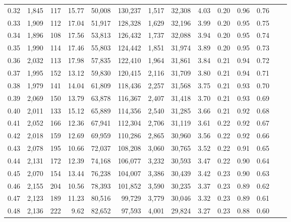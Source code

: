 \begin{tabular}{rrrrrrrrrrrrrr}
0.32 &  1,845 &    117 &   15.77 &   50,008 &  130,237 &   1,517 &  32,308 &  4.03 &  0.20 &  0.96 &      0.76 \\
0.33 &  1,909 &    112 &   17.04 &   51,917 &  128,328 &   1,629 &  32,196 &  3.99 &  0.20 &  0.95 &      0.75 \\
0.34 &  1,896 &    108 &   17.56 &   53,813 &  126,432 &   1,737 &  32,088 &  3.94 &  0.20 &  0.95 &      0.74 \\
0.35 &  1,990 &    114 &   17.46 &   55,803 &  124,442 &   1,851 &  31,974 &  3.89 &  0.20 &  0.95 &      0.73 \\
0.36 &  2,032 &    113 &   17.98 &   57,835 &  122,410 &   1,964 &  31,861 &  3.84 &  0.21 &  0.94 &      0.72 \\
0.37 &  1,995 &    152 &   13.12 &   59,830 &  120,415 &   2,116 &  31,709 &  3.80 &  0.21 &  0.94 &      0.71 \\
0.38 &  1,979 &    141 &   14.04 &   61,809 &  118,436 &   2,257 &  31,568 &  3.75 &  0.21 &  0.93 &      0.70 \\
0.39 &  2,069 &    150 &   13.79 &   63,878 &  116,367 &   2,407 &  31,418 &  3.70 &  0.21 &  0.93 &      0.69 \\
0.40 &  2,011 &    133 &   15.12 &   65,889 &  114,356 &   2,540 &  31,285 &  3.66 &  0.21 &  0.92 &      0.68 \\
0.41 &  2,052 &    166 &   12.36 &   67,941 &  112,304 &   2,706 &  31,119 &  3.61 &  0.22 &  0.92 &      0.67 \\
0.42 &  2,018 &    159 &   12.69 &   69,959 &  110,286 &   2,865 &  30,960 &  3.56 &  0.22 &  0.92 &      0.66 \\
0.43 &  2,078 &    195 &   10.66 &   72,037 &  108,208 &   3,060 &  30,765 &  3.52 &  0.22 &  0.91 &      0.65 \\
0.44 &  2,131 &    172 &   12.39 &   74,168 &  106,077 &   3,232 &  30,593 &  3.47 &  0.22 &  0.90 &      0.64 \\
0.45 &  2,070 &    154 &   13.44 &   76,238 &  104,007 &   3,386 &  30,439 &  3.42 &  0.23 &  0.90 &      0.63 \\
0.46 &  2,155 &    204 &   10.56 &   78,393 &  101,852 &   3,590 &  30,235 &  3.37 &  0.23 &  0.89 &      0.62 \\
0.47 &  2,123 &    189 &   11.23 &   80,516 &   99,729 &   3,779 &  30,046 &  3.32 &  0.23 &  0.89 &      0.61 \\
0.48 &  2,136 &    222 &    9.62 &   82,652 &   97,593 &   4,001 &  29,824 &  3.27 &  0.23 &  0.88 &      0.60 \\

\end{tabular}
